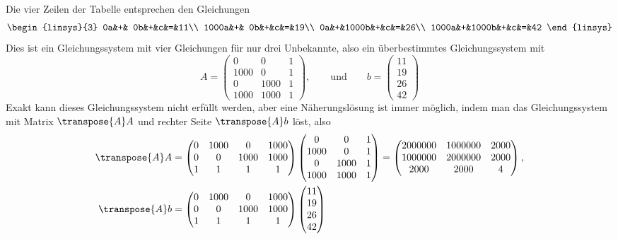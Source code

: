\begin{loesung}
Die vier Zeilen der Tabelle entsprechen den Gleichungen
\[
\begin{linsys}{3}
   0a&+&   0b&+&c&=&11\\
1000a&+&   0b&+&c&=&19\\
   0a&+&1000b&+&c&=&26\\
1000a&+&1000b&+&c&=&42
\end{linsys}
\]
Dies ist ein Gleichungssystem mit vier Gleichungen für nur drei Unbekannte,
also ein überbestimmtes Gleichungssystem mit
\[
A=\begin{pmatrix}
   0&   0&1\\
1000&   0&1\\
   0&1000&1\\
1000&1000&1
\end{pmatrix}
,\qquad\text{und}\qquad b=\begin{pmatrix}
11\\
19\\
26\\
42
\end{pmatrix}
\]
Exakt kann dieses Gleichungssystem nicht erfüllt werden, aber eine
Näherungs\-lösung ist immer möglich, indem man das Gleichungssystem
mit Matrix $\transpose{A}A$ und rechter Seite $\transpose{A}b$ löst, also
\begin{align*}
\transpose{A}A&=
\begin{pmatrix}
0&1000&   0&1000\\
0&   0&1000&1000\\
1&   1&   1&   1
\end{pmatrix}
\begin{pmatrix}
   0&   0&1\\
1000&   0&1\\
   0&1000&1\\
1000&1000&1
\end{pmatrix}
=
\begin{pmatrix}
2000000&1000000&2000\\
1000000&2000000&2000\\
   2000&   2000&   4
\end{pmatrix},
\\
\transpose{A}b&=
\begin{pmatrix}
0&1000&   0&1000\\
0&   0&1000&1000\\
1&   1&   1&   1
\end{pmatrix}
\begin{pmatrix}
11\\19\\26\\42

\end{pmatrix}
\end{align*}
\end{loesung}
